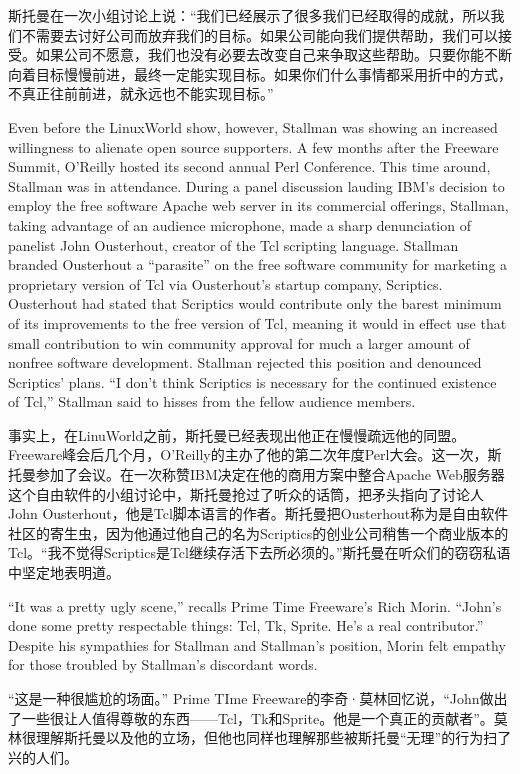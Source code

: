 \ifdefined\chs
斯托曼在一次小组讨论上说：“我们已经展示了很多我们已经取得的成就，所以我们不需要去讨好公司而放弃我们的目标。如果公司能向我们提供帮助，我们可以接受。如果公司不愿意，我们也没有必要去改变自己来争取这些帮助。只要你能不断向着目标慢慢前进，最终一定能实现目标。如果你们什么事情都采用折中的方式，不真正往前前进，就永远也不能实现目标。”
\fi

\ifdefined\eng
Even before the LinuxWorld show, however, Stallman was showing an increased willingness to alienate open source supporters. A few months after the Freeware Summit, O'Reilly hosted its second annual Perl Conference. This time around, Stallman was in attendance. During a panel discussion lauding IBM's decision to employ the free software Apache web server in its commercial offerings, Stallman, taking advantage of an audience microphone, made a sharp denunciation of panelist John Ousterhout, creator of the Tcl scripting language. Stallman branded Ousterhout a ``parasite'' on the free software community for marketing a proprietary version of Tcl via Ousterhout's startup company, Scriptics.  Ousterhout had stated that Scriptics would contribute only the barest minimum of its improvements to the free version of Tcl, meaning it would in effect use that small contribution to win community approval for much a larger amount of nonfree software development.  Stallman rejected this position and denounced Scriptics' plans. ``I don't think Scriptics is necessary for the continued existence of Tcl,'' Stallman said to hisses from the fellow audience members.
\fi

\ifdefined\chs
事实上，在LinuWorld之前，斯托曼已经表现出他正在慢慢疏远他的同盟。Freeware峰会后几个月，O'Reilly的主办了他的第二次年度Perl大会。这一次，斯托曼参加了会议。在一次称赞IBM决定在他的商用方案中整合Apache Web服务器这个自由软件的小组讨论中，斯托曼抢过了听众的话筒，把矛头指向了讨论人John Ousterhout，他是Tcl脚本语言的作者。斯托曼把Ousterhout称为是自由软件社区的寄生虫，因为他通过他自己的名为Scriptics的创业公司稍售一个商业版本的Tcl。“我不觉得Scriptics是Tcl继续存活下去所必须的。”斯托曼在听众们的窃窃私语中坚定地表明道。
\fi

\ifdefined\eng
``It was a pretty ugly scene,'' recalls Prime Time Freeware's Rich Morin. ``John's done some pretty respectable things: Tcl, Tk, Sprite. He's a real contributor.''  Despite his sympathies for Stallman and Stallman's position, Morin felt empathy for those troubled by Stallman's discordant words.
\fi

\ifdefined\chs
“这是一种很尴尬的场面。” Prime TIme Freeware的李奇·莫林回忆说，“John做出了一些很让人值得尊敬的东西——Tcl，Tk和Sprite。他是一个真正的贡献者”。莫林很理解斯托曼以及他的立场，但他也同样也理解那些被斯托曼“无理”的行为扫了兴的人们。
\fi


